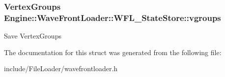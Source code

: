 \subsubsection[{vgroups}]{\setlength{\rightskip}{0pt plus 5cm}Vertex\+Groups Engine\+::\+Wave\+Front\+Loader\+::\+W\+F\+L\+\_\+\+State\+Store\+::vgroups}\label{structEngine_1_1WaveFrontLoader_1_1WFL__StateStore_a511e8e74a37201e4d835f2dc6ae195d8}
Save Vertex\+Groups 

The documentation for this struct was generated from the following file\+:\begin{DoxyCompactItemize}
\item 
include/\+File\+Loader/wavefrontloader.\+h\end{DoxyCompactItemize}
